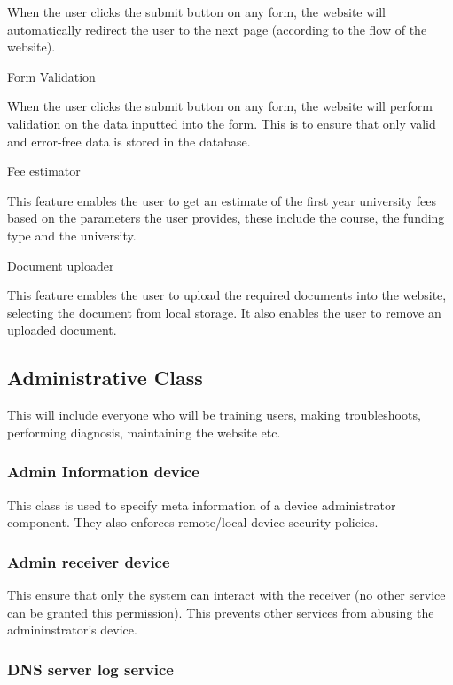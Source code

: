 \documentclass[a4paper, 12pt]{article}
\begin{document}
When the user clicks the submit button on any form, the website will automatically redirect the user to the next page (according to the flow of the website).

\underline{Form Validation}

When the user clicks the submit button on any form, the website will perform validation on the data inputted into the form. This is to ensure that only valid and error-free data is stored in the database.

\underline{Fee estimator}

This feature enables the user to get an estimate of the first year university fees based on the parameters the user provides, these include the course, the funding type and the university.

\underline{Document uploader}

This feature enables the user to upload the required documents into the website, selecting the document from local storage. It also enables the user to remove an uploaded document.

\subsection{Administrative Class}

This will include everyone who will be training users, making troubleshoots, performing diagnosis, maintaining the website etc. 


\subsubsection{Admin Information device}

This class is used to specify meta information of a device administrator component. They also enforces remote/local device security policies.

\subsubsection{Admin receiver device}

This ensure that only the system can interact with the receiver (no other service can be granted this permission). This prevents other services from abusing the admininstrator's device.

\subsubsection{DNS server log service}
\end{document}
